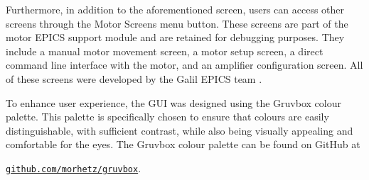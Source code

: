     Furthermore, in addition to the aforementioned screen, users can access other screens through the Motor Screens menu button.
    These screens are part of the motor EPICS support module and are retained for debugging purposes.
    They include a manual motor movement screen, a motor setup screen, a direct command line interface with the motor, and an amplifier configuration screen.
    All of these screens were developed by the Galil EPICS team \cite{farnswort2009}.

    To enhance user experience, the GUI was designed using the Gruvbox colour palette.
    This palette is specifically chosen to ensure that colours are easily distinguishable, with sufficient contrast, while also being visually appealing and comfortable for the eyes.
    The Gruvbox colour palette can be found on GitHub at

    \begin{center}
        \hyperlink{github.com/morhetz/gruvbox}{\texttt{github.com/morhetz/gruvbox}}.
    \end{center}
